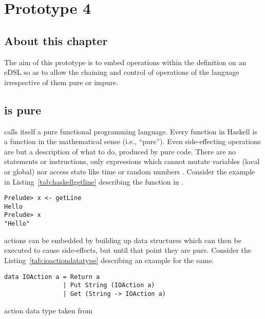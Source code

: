 \documentclass[thesis-solanki.tex]{subfiles}
\begin{document}
\chapter{Prototype 4}{\label{proto4}}


\section{About this chapter}
The aim of this prototype is to embed  operations within the definition on an eDSL so as to allow the chaining and control 
of operations of the language irrespective of them pure or impure.

\section{  is pure}

\cite{website:ioispurechristaylor}

 calls itself a pure functional programming language. Every function in Haskell is a function in the mathematical sense (i.e., ``pure'').
 Even side-effecting  operations are but a description of what to do, produced by pure code. There are no statements or instructions, 
 only expressions which cannot mutate variables (local or global) nor access state like time or random numbers \cite{website:haskellorg}. Consider the
 example in Listing~\ref{tab:haskellgetline} describing the  function in . 

\begin{code-list}[H]
\begin{singlespace}
\begin{verbatim}
Prelude> x <- getLine
Hello
Prelude> x
"Hello"
\end{verbatim}
\end{singlespace}
\caption{ }
\label{tab:haskellgetline}
\end{code-list}

 actions can be embedded by building up data structures which can then be executed to cause side-effects, but until that point they 
are pure. Consider the Listing~\ref{tab:ioactiondatatype} describing an example for the same.

\begin{code-list}[H]
\begin{singlespace}
\begin{verbatim}
data IOAction a = Return a
                | Put String (IOAction a)
                | Get (String -> IOAction a)
\end{verbatim}
\end{singlespace}
\caption{ action data type taken from \cite{website:ioispurechristaylor}}
\label{tab:ioactiondatatype}
\end{code-list}
\end{document}
